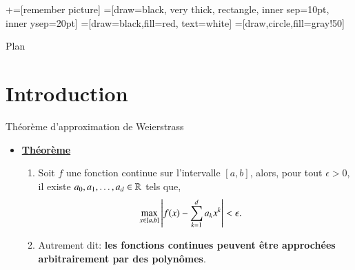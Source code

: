 \usetikzlibrary{positioning}
\usetikzlibrary{snakes}
\usetikzlibrary{calc}
\usetikzlibrary{arrows}
\usetikzlibrary{decorations.markings}
\usetikzlibrary{shapes.misc}
\usetikzlibrary{matrix,shapes,arrows,fit,tikzmark}
\usetikzlibrary{shapes}
\newcommand\marktopleft[1]{%
    \tikz[overlay,remember picture] 
        \node (marker-#1-a) at (-.3em,.3em) {};%
}
\newcommand\markbottomright[2]{%
    \tikz[overlay,remember picture] 
        \node (marker-#1-b) at (0em,0em) {};%
}
+=[remember picture] 
 =[draw=black, very thick, rectangle, inner sep=10pt, inner ysep=20pt]
 =[draw=black,fill=red, text=white]
=[draw,circle,fill=gray!50]



\begin{frame}
\titlepage
\end{frame}
\begin{frame}{Plan}
 \tableofcontents
    \end{frame}


\section{Introduction}
\frame{\sectionpage}

\begin{frame}[allowframebreaks]{Théorème d'approximation de  Weierstrass}
    \begin{itemize}
        \item \textbf{\underline{Théorème}}
        \begin{enumerate}[-]
            \item Soit $f$ une fonction continue sur l'intervalle $[a, b]$, alors, pour tout $\epsilon>0$, il existe 
            $a_0, a_1, \ldots, a_d \in \mathbb{R}$ tels que, \begin{align*}
                \max_{x\in[a, b]}\left\vert {f(x) - \sum_{k=1}^d a_kx^k} \right\vert&<\epsilon.
            \end{align*}
            \item Autrement dit: \textbf{les fonctions continues peuvent être approchées arbitrairement par des polynômes}.
        \end{enumerate}
    \end{itemize}
\end{frame}

